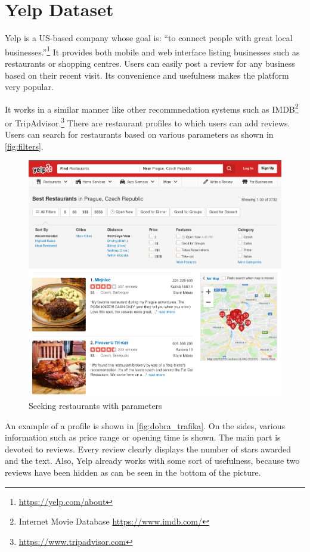 \appendix
\addappheadtotoc
\chapter{Yelp Dataset}\label{app:dataset}

Yelp is a US-based company whose goal is: ``to connect people with great local businesses.''\footnote{\url{https://yelp.com/about}}
It provides both mobile and web interface listing businesses such as restaurants or shopping centres.
Users can easily post a review for any business based on their recent visit.
Its convenience and usefulness makes the platform very popular.

It works in a similar manner like other recommnedation systems such as IMDB\footnote{Internet Movie Database \url{https://www.imdb.com/}} or
TripAdvisor.\footnote{\url{https://www.tripadvisor.com}}
There are restaurant profiles to which users can add reviews.
Users can search for restaurants based on various parameters as shown in \autoref{fig:filters}.

\begin{figure}[ht]\centering
\includegraphics[width=130mm]{../img/filters.png}
\caption{Seeking restaurants with parameters}
\label{fig:filters}
\end{figure}

An example of a profile is shown in \autoref{fig:dobra_trafika}.
On the sides, various information such as price range or opening time is shown.
The main part is devoted to reviews.
Every review clearly displays the number of stars awarded and the text.
Also, Yelp already works with some sort of usefulness,
because two reviews have been hidden as can be seen in the bottom of the picture.


